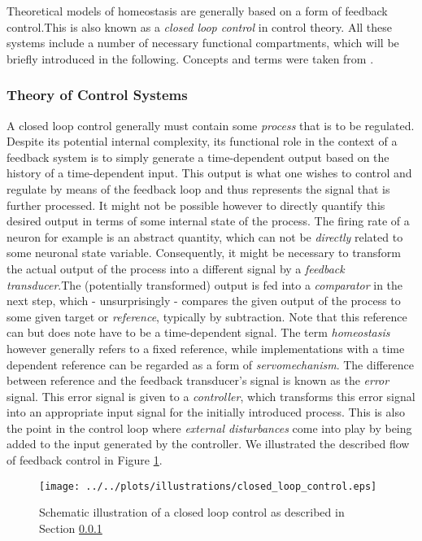 \documentclass[10pt,a4paper]{article}
\begin{document}
Theoretical models of homeostasis are generally based on a form of feedback control.This is also known as a \textit{closed loop control} in control theory. All these systems include a number of necessary functional compartments, which will be briefly introduced in the following. Concepts and terms were taken from \cite[p. 59-64]{Cybernetik_Systems_Cruse_2006}.
\newpage
\subsubsection{Theory of Control Systems} \label{Control_Sys_Theo_Section}
A closed loop control generally must contain some \emph{process} that is to be regulated. Despite its potential internal complexity, its functional role in the context of a feedback system is to simply generate a time-dependent output based on the history of a time-dependent input. This output is what one wishes to control and regulate by means of the feedback loop and thus represents the signal that is further processed. It might not be possible however to directly quantify this desired output in terms of some internal state of the process. The firing rate of a neuron for example is an abstract quantity, which can not be \emph{directly} related to some neuronal state variable. Consequently, it might be necessary to transform the actual output of the process into a different signal by a \textit{feedback transducer}.The (potentially transformed) output is fed into a \textit{comparator} in the next step, which - unsurprisingly - compares the given output of the process to some given target or \textit{reference}, typically by subtraction. Note that this reference can but does note have to be a time-dependent signal. The term \textit{homeostasis} however generally refers to a fixed reference, while implementations with a time dependent reference can be regarded as a form of \textit{servomechanism}. The difference between reference and the feedback transducer's signal is known as the \textit{error} signal. This error signal is given to a \textit{controller}, which transforms this error signal into an appropriate input signal for the initially introduced process. This is also the point in the control loop where \textit{external disturbances} come into play by being added to the input generated by the controller. We illustrated the described flow of feedback control in Figure \ref{Closed_Loop_Control_Illustration}.
\begin{figure}
\begin{center}
\texttt{[image: ../../plots/illustrations/closed\_loop\_control.eps]}
\end{center}
\caption{Schematic illustration of a closed loop control as described in Section \ref{Control_Sys_Theo_Section}}
\label{Closed_Loop_Control_Illustration}
\end{figure}
\end{document}
